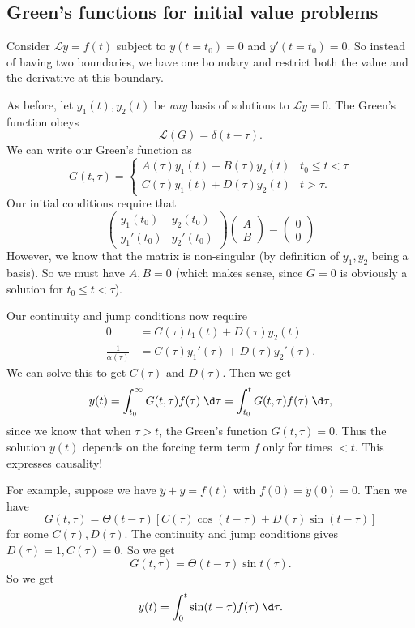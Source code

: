\documentclass[a4paper]{article}
\begin{document}
\subsection{Green's functions for initial value problems}
Consider $\mathcal{L}y = f(t)$ subject to $y(t = t_0) = 0$ and $y'(t = t_0) = 0$. So instead of having two boundaries, we have one boundary and restrict both the value and the derivative at this boundary.

As before, let $y_1(t), y_2(t)$ be \emph{any} basis of solutions to $\mathcal{L} y = 0$. The Green's function obeys
\[
  \mathcal{L}(G) = \delta(t - \tau).
\]
We can write our Green's function as
\[
  G(t, \tau) =
  \begin{cases}
    A(\tau) y_1(t) + B(\tau) y_2(t) & t_0 \leq t < \tau\\
    C(\tau) y_1(t) + D(\tau) y_2(t) & t > \tau.
  \end{cases}
\]
Our initial conditions require that
\[
  \begin{pmatrix}
    y_1(t_0) & y_2(t_0)\\
    y_1'(t_0) & y_2'(t_0)
  \end{pmatrix}
  \begin{pmatrix}
    A\\
    B
  \end{pmatrix}
  =
  \begin{pmatrix}
    0\\0
  \end{pmatrix}
\]
However, we know that the matrix is non-singular (by definition of $y_1, y_2$ being a basis). So we must have $A, B = 0$ (which makes sense, since $G = 0$ is obviously a solution for $t_0 \leq t < \tau$).

Our continuity and jump conditions now require
\begin{align*}
  0 &= C(\tau) t_1(t) + D(\tau) y_2(t)\\
  \frac{1}{\alpha(\tau)} &= C(\tau) y_1'(\tau) + D(\tau) y_2'(\tau).
\end{align*}
We can solve this to get $C(\tau)$ and $D(\tau)$. Then we get
\[
  y(t) = \int_{t_0}^\infty G(t, \tau) f(\tau)\;\d \tau = \int_{t_0}^t G(t, \tau) f(\tau) \;\d \tau,
\]
since we know that when $\tau > t$, the Green's function $G(t, \tau) = 0$. Thus the solution $y(t)$ depends on the forcing term term $f$ only for times $ < t$. This expresses causality!

\begin{eg}
  For example, suppose we have $\ddot{y} + y = f(t)$ with $f(0) = \dot{y}(0) = 0$. Then we have
  \[
    G(t, \tau) = \Theta(t - \tau) [C(\tau) \cos(t - \tau) + D(\tau) \sin (t - \tau)]
  \]
  for some $C(\tau), D(\tau)$. The continuity and jump conditions gives $D(\tau) = 1, C(\tau) = 0$. So we get
  \[
    G(t, \tau) = \Theta(t - \tau) \sin t(\tau).
  \]
  So we get
  \[
    y(t) = \int_0^t \sin (t - \tau) f(\tau) \;\d \tau.
  \]
\end{eg}
\end{document}
